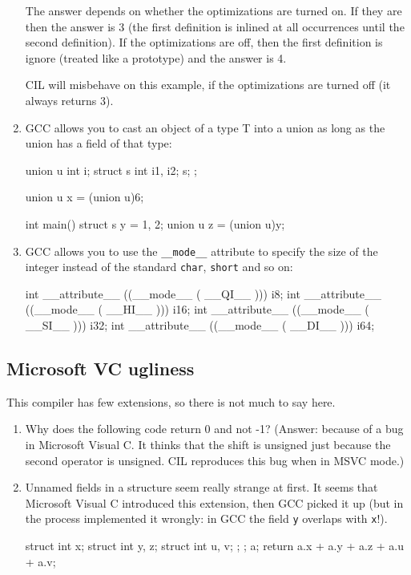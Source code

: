 \documentclass{article}
\def\t#1{{\tt #1}}
\begin{document}
\begin{enumerate}
 The answer depends on whether the optimizations are turned on. If they are
then the answer is 3 (the first definition is inlined at all occurrences until
the second definition). If the optimizations are off, then the first
definition is ignore (treated like a prototype) and the answer is 4. 

 CIL will misbehave on this example, if the optimizations are turned off (it
 always returns 3).

\item GCC allows you to cast an object of a type T into a union as long as the
union has a field of that type:
\begin{cilcode}[global]
union u { 
   int i; 
   struct s { 
      int i1, i2;
   } s;
};

union u x = (union u)6;

int main() {
  struct s y = {1, 2};
  union u  z = (union u)y;
}
\end{cilcode}

\item GCC allows you to use the \t{\_\_mode\_\_} attribute to specify the size
of the integer instead of the standard \t{char}, \t{short} and so on:
\begin{cilcode}[global]
int __attribute__ ((__mode__ (  __QI__ ))) i8;
int __attribute__ ((__mode__ (  __HI__ ))) i16;
int __attribute__ ((__mode__ (  __SI__ ))) i32;
int __attribute__ ((__mode__ (  __DI__ ))) i64;
\end{cilcode}

\end{enumerate}

 \subsection{Microsoft VC ugliness}

 This compiler has few extensions, so there is not much to say here.

\begin{enumerate}
\item Why does the following code return 0 and not -1? (Answer: because of a
bug in Microsoft Visual C. It thinks that the shift is unsigned just because
the second operator is unsigned. CIL reproduces this bug when in MSVC mode.)


\item Unnamed fields in a structure seem really strange at first. It seems
that Microsoft Visual C introduced this extension, then GCC picked it up (but
in the process implemented it wrongly: in GCC the field \t{y} overlaps with
\t{x}!).

\begin{cilcode}[local]
struct {
  int x;
  struct {
     int y, z;
     struct {
       int u, v;
     };
 };
} a;
return a.x + a.y + a.z + a.u + a.v;
\end{cilcode}


\end{enumerate}
\end{document}
